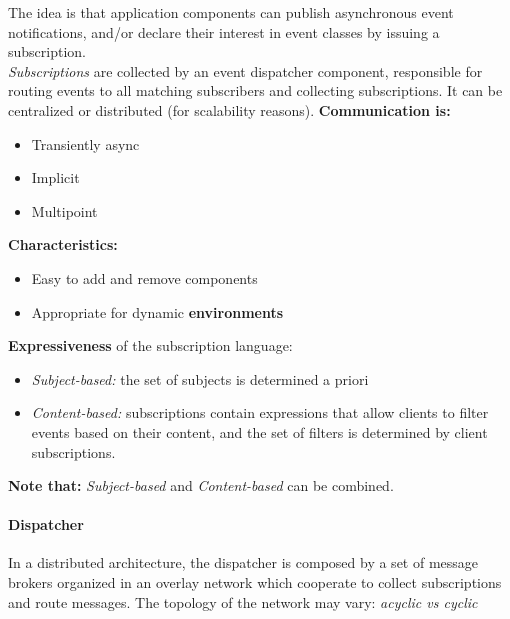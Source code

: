 The idea is that application components can publish asynchronous event notifications, and/or declare their interest in event classes by issuing a subscription.\\
\textit{Subscriptions} are collected by an event dispatcher component, responsible for routing events to all matching subscribers and collecting subscriptions. It can be centralized or distributed (for scalability reasons).
\textbf{Communication is:}
\begin{itemize}
    \item Transiently async
    \item Implicit
    \item Multipoint
\end{itemize}
\textbf{Characteristics:}
\begin{itemize}
    \item Easy to add and remove components
    \item Appropriate for dynamic \textbf{environments}
\end{itemize}
\textbf{Expressiveness} of the subscription language:
\begin{itemize}
    \item \emph{Subject-based:} the set of subjects is determined a priori
    \item \emph{Content-based:} subscriptions contain expressions that allow clients to filter events based on their content, and the set of filters is determined by client subscriptions.
\end{itemize}

\textbf{Note that:} \emph{Subject-based} and \emph{Content-based} can be combined.

\paragraph{Dispatcher}

In a distributed architecture, the dispatcher is composed by a set of message brokers organized in an overlay network which cooperate to collect subscriptions and route messages. The topology of the network may vary: \emph{acyclic vs cyclic}

